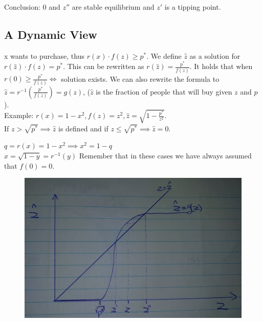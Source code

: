 \documentclass[12pt]{scrartcl}
\begin{document}
\noindent Conclusion: 0 and $z''$ are stable equilibrium and $z'$ is a tipping point.



\subsection{A Dynamic View}
x wants to purchase, thus $r(x)\cdot f(z) \geq p^{*}$. We define $\hat{z}$ as a solution for $r(\hat{z})\cdot f(z) = p^{*}$. This can be rewritten as $r(\hat{z}) = \frac{p^{*}}{f(z)}$. It holds that when $r(0) \geq \frac{p^{*}}{f(z)} \iff$ solution exists. We can also rewrite the formula to $\hat{z} = r^{-1}(\frac{p^{*}}{f(z)}) = g(z)$, ($\hat{z}$ is the fraction of people that will buy given $z$ and $p$).\\

\noindent Example: $r(x) = 1 - x^{2}, f(z) = z^{2}, \hat{z} = \sqrt{1-\frac{p^{*}}{z^{2}}}$.\\
If $z > \sqrt{p^{*}} \implies \hat{z}$ is defined and if $z \leq \sqrt{p^{*}} \implies \hat{z} = 0$. 

\noindent $q = r(x) = 1 - x^{2} \implies x^{2} = 1 - q$\\
$x = \sqrt{1-y} = r^{-1}(y)$
Remember that in these cases we have always assumed that $f(0) = 0$.

\begin{figure}[h]
	\centering
	\includegraphics[width=\textwidth]{./images/graph_z_hat.png}
\end{figure}
\end{document}
